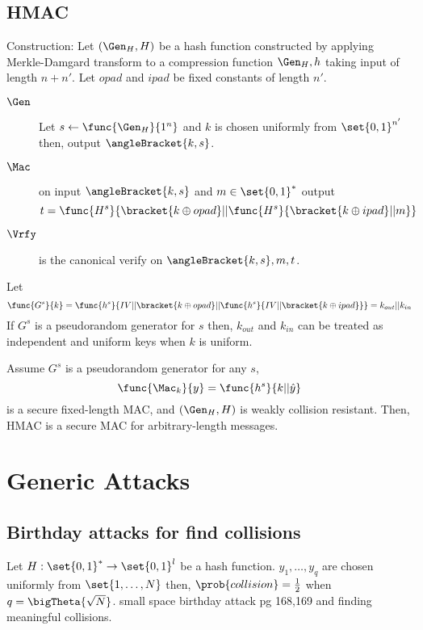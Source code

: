 \subsection{HMAC}
Construction:
Let \((\Gen_H,H)\) be a hash function constructed by applying Merkle-Damgard transform to a compression function \(\Gen_H,h\) taking input of length \(n + n'\). Let \(opad\) and \(ipad\) be fixed constants of length \(n'\).
\begin{description}
    \item [\(\Gen\)] Let \(s \gets \func{\Gen_H}{1^n}\) and \(k\) is chosen uniformly from \(\set{0,1}^{n'}\) then, output \(\angleBracket{k,s}\).
    \item [\(\Mac\)] on input \(\angleBracket{k,s}\) and \(m \in \set{0,1}^{\ast}\) output 
    \begin{equation*}
        t = \func{H^s}{\bracket{k \oplus opad} || \func{H^s}{\bracket{k \oplus ipad }|| m}}
    \end{equation*}
    \item [\(\Vrfy\)] is the canonical verify on \(\angleBracket{k,s},m,t\).
\end{description}
Let 
\begin{equation*}
    \func{G^s}{k} = \func{h^s}{IV || \bracket{k \oplus opad} || \func{h^s}{IV ||\bracket{k \oplus ipad}}} = k_{out} || k_{in}
\end{equation*}
If \(G^s\) is a pseudorandom generator for \(s\) then, \(k_{out}\) and \(k_{in}\) can be treated as independent and uniform keys when \(k\) is uniform.

\begin{theorem}
    Assume \(G^s\) is a pseudorandom generator for any \(s\), 
    \begin{equation*}
        \func{\Mac_k}{y} = \func{h^s}{k||\hat{y}}
    \end{equation*}
    is a secure fixed-length MAC, and \((\Gen_H,H)\) is weakly collision resistant. Then, HMAC is a secure MAC for arbitrary-length messages.
\end{theorem}
\section{Generic Attacks}
\subsection{Birthday attacks for find collisions}
Let \(H: \set{0,1}^{\ast} \to \set{0,1}^l\) be a hash function. \(y_1, \dots , y_q\) are chosen uniformly from \(\set{1,\dots , N}\) then, \(\prob{collision} = \frac{1}{2}\) when \(q = \bigTheta{\sqrt{N}}\).
small space birthday attack pg 168,169 and finding meaningful collisions. 

